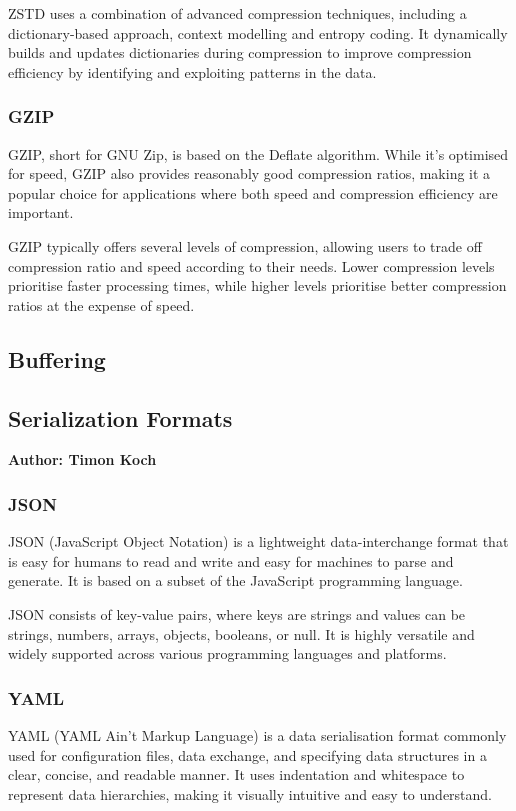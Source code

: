 ZSTD uses a combination of advanced compression techniques, including a dictionary-based approach, context modelling and entropy coding. It dynamically builds and updates dictionaries during compression to improve compression efficiency by identifying and exploiting patterns in the data.

\subsubsection{GZIP}
GZIP, short for GNU Zip, is based on the Deflate algorithm. While it's optimised for speed, GZIP also provides reasonably good compression ratios, making it a popular choice for applications where both speed and compression efficiency are important.

GZIP typically offers several levels of compression, allowing users to trade off compression ratio and speed according to their needs. Lower compression levels prioritise faster processing times, while higher levels prioritise better compression ratios at the expense of speed.

\subsection{Buffering}

\subsection{Serialization Formats}
\textbf{Author: Timon Koch}

\subsubsection{JSON}
JSON (JavaScript Object Notation) is a lightweight data-interchange format that is easy for humans to read and write and easy for machines to parse and generate. It is based on a subset of the JavaScript programming language.

JSON consists of key-value pairs, where keys are strings and values can be strings, numbers, arrays, objects, booleans, or null. It is highly versatile and widely supported across various programming languages and platforms.

\subsubsection{YAML}
YAML (YAML Ain't Markup Language) is a data serialisation format commonly used for configuration files, data exchange, and specifying data structures in a clear, concise, and readable manner. It uses indentation and whitespace to represent data hierarchies, making it visually intuitive and easy to understand.

